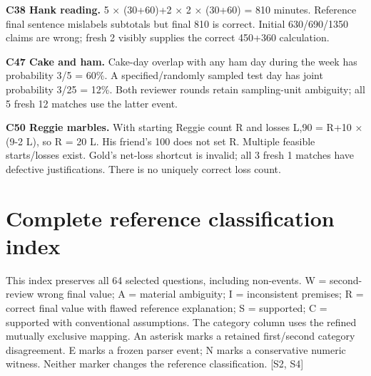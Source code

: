 \documentclass[12pt,a4paper]{report}
\begin{document}
\textbf{C38 Hank reading.} 5 × (30+60)+2 × 2 × (30+60) = 810 minutes.
Reference final sentence mislabels subtotals but final 810 is correct.
Initial 630/690/1350 claims are wrong; fresh 2 visibly supplies the
correct 450+360 calculation.

\textbf{C47 Cake and ham.} Cake-day overlap with any ham day during the
week has probability 3/5 = 60\%. A specified/randomly sampled test day
has joint probability 3/25 = 12\%. Both reviewer rounds retain
sampling-unit ambiguity; all 5 fresh 12 matches use the latter event.

\textbf{C50 Reggie marbles.} With starting Reggie count R and losses
L,90 = R+10 × (9-2 L), so R = 20 L. His friend's 100 does not set R.
Multiple feasible starts/losses exist. Gold's net-loss shortcut is
invalid; all 3 fresh 1 matches have defective justifications. There is
no uniquely correct loss count.

\section{Complete reference classification
index}\label{complete-reference-classification-index}

This index preserves all 64 selected questions, including non-events. W
= second-review wrong final value; A = material ambiguity; I =
inconsistent premises; R = correct final value with flawed reference
explanation; S = supported; C = supported with conventional assumptions.
The category column uses the refined mutually exclusive mapping. An
asterisk marks a retained first/second category disagreement. E marks a
frozen parser event; N marks a conservative numeric witness. Neither
marker changes the reference classification. {[}S2, S4{]}
\end{document}
